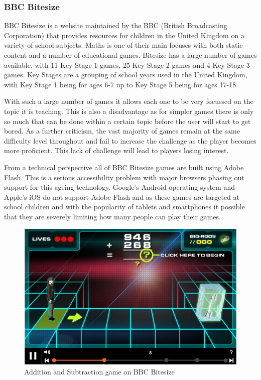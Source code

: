 \documentclass[12pt,a4paper]{report}
\begin{document}
\subsubsection{BBC Bitesize}
BBC Bitesize is a website maintained by the BBC (British Broadcasting Corporation) that provides resources for children in the United Kingdom on a variety of school subjects. Maths is one of their main focuses with both static content and a number of educational games. Bitesize has a large number of games available, with 11 Key Stage 1 games, 25 Key Stage 2 games and 4 Key Stage 3 games. Key Stages are a grouping of school years used in the United Kingdom, with Key Stage 1 being for ages 6-7 up to Key Stage 5 being for ages 17-18.

With such a large number of games it allows each one to be very focussed on the topic it is teaching. This is also a disadvantage as for simpler games there is only so much that can be done within a certain topic before the user will start to get bored. As a further criticism, the vast majority of games remain at the same difficulty level throughout and fail to increase the challenge as the player becomes more proficient. This lack of challenge will lead to players losing interest. 

From a technical perspective all of BBC Bitesize games are built using Adobe Flash. This is a serious accessibility problem with major browsers phasing out support for this ageing technology. Google's Android operating system and Apple's iOS do not support Adobe Flash  and as these games are targeted at school children and with the popularity of tablets and smartphones it possible that they are severely limiting how many people can play their games.

\begin{figure}[!tbp]
  \centering
  \begin{minipage}[b]{1\textwidth}
    \includegraphics[width=\textwidth]{BBCBitesize}
    \caption{Addition and Subtraction game on BBC Bitesize}
  \end{minipage}
\end{figure}
\FloatBarrier
\end{document}
